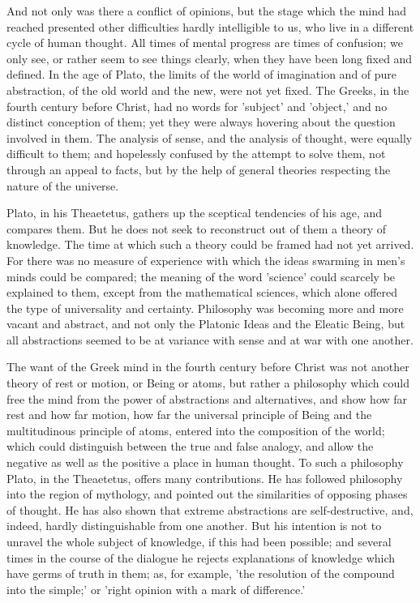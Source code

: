 And not only was there a conflict of opinions, but the stage which the
mind had reached presented other difficulties hardly intelligible to
us, who live in a different cycle of human thought. All times of mental
progress are times of confusion; we only see, or rather seem to see
things clearly, when they have been long fixed and defined. In the
age of Plato, the limits of the world of imagination and of pure
abstraction, of the old world and the new, were not yet fixed. The
Greeks, in the fourth century before Christ, had no words for 'subject'
and 'object,' and no distinct conception of them; yet they were always
hovering about the question involved in them. The analysis of sense, and
the analysis of thought, were equally difficult to them; and hopelessly
confused by the attempt to solve them, not through an appeal to facts,
but by the help of general theories respecting the nature of the
universe.

Plato, in his Theaetetus, gathers up the sceptical tendencies of his
age, and compares them. But he does not seek to reconstruct out of them
a theory of knowledge. The time at which such a theory could be framed
had not yet arrived. For there was no measure of experience with which
the ideas swarming in men's minds could be compared; the meaning of
the word 'science' could scarcely be explained to them, except from the
mathematical sciences, which alone offered the type of universality and
certainty. Philosophy was becoming more and more vacant and abstract,
and not only the Platonic Ideas and the Eleatic Being, but all
abstractions seemed to be at variance with sense and at war with one
another.

The want of the Greek mind in the fourth century before Christ was
not another theory of rest or motion, or Being or atoms, but rather a
philosophy which could free the mind from the power of abstractions
and alternatives, and show how far rest and how far motion, how far the
universal principle of Being and the multitudinous principle of atoms,
entered into the composition of the world; which could distinguish
between the true and false analogy, and allow the negative as well as
the positive a place in human thought. To such a philosophy Plato, in
the Theaetetus, offers many contributions. He has followed philosophy
into the region of mythology, and pointed out the similarities of
opposing phases of thought. He has also shown that extreme abstractions
are self-destructive, and, indeed, hardly distinguishable from one
another. But his intention is not to unravel the whole subject of
knowledge, if this had been possible; and several times in the course
of the dialogue he rejects explanations of knowledge which have germs of
truth in them; as, for example, 'the resolution of the compound into the
simple;' or 'right opinion with a mark of difference.'

